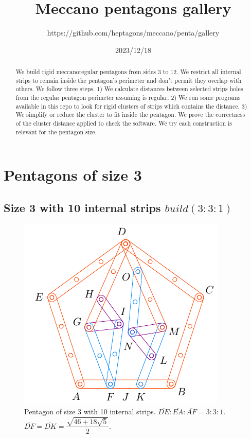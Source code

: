 \documentclass[11pt]{article}
\title{Meccano pentagons gallery}
\author{https://github.com/heptagons/meccano/penta/gallery}
\date{2023/12/18}
\begin{document}
\maketitle
\begin{abstract}
We build rigid meccano\meccanoref regular pentagons from sides $3$ to $12$. We restrict all internal strips to remain inside the pentagon's perimeter and don't permit they overlap with others. We follow three steps. 1) We calculate distances between selected strips holes from the regular pentagon perimeter assuming is regular. 2) We run some programs available in this repo to look for rigid clusters of strips which contains the distance. 3) We simplify or reduce the cluster to fit inside the pentagon. We prove the correctness of the cluster distance applied to check the software. We try each construction is relevant for the pentagon size.
\end{abstract}


\section{Pentagons of size 3}

\subsection{Size 3 with 10 internal strips $build(3:3:1)$}

\begin{figure}[h]
\centering
\includegraphics[scale=1.2]{3/penta3-10a}
\caption{Pentagon of size 3 with 10 internal strips. $\overline{DE}:\overline{EA}:\overline{AF} = 3:3:1$. $\overline{DF} = \overline{DK} = \dfrac{\sqrt{46+18\sqrt5}}2$.}
\label{fig:penta3-10a}
\end{figure}
\end{document}
